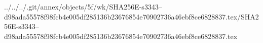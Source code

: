 ../../../.git/annex/objects/5f/wk/SHA256E-s3343--d98ada55578f98fcb4e005df285136b23676854e70902736a46ebf8ce6828837.tex/SHA256E-s3343--d98ada55578f98fcb4e005df285136b23676854e70902736a46ebf8ce6828837.tex